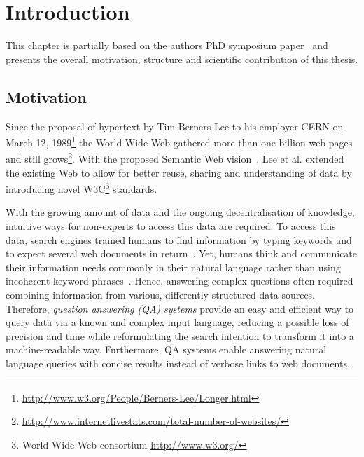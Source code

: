 \chapter{Introduction}
This chapter is partially based on the authors PhD symposium paper~\cite{combiningLDandIR} and presents the overall motivation, structure and scientific contribution of this thesis.
\section{Motivation}
Since the proposal of hypertext by Tim-Berners Lee to his employer CERN on March 12, 1989\footnote{\url{http://www.w3.org/People/Berners-Lee/Longer.html}} the World Wide Web gathered more than one billion web pages and still grows\footnote{\url{http://www.internetlivestats.com/total-number-of-websites/}}.
With the proposed Semantic Web vision~\cite{bernerslee2001semantic}, Lee et al. extended the existing Web to allow for better reuse, sharing and understanding of data by introducing novel W3C\footnote{World Wide Web consortium \url{http://www.w3.org/}} standards. 

With the growing amount of data and the ongoing decentralisation of knowledge, intuitive ways for non-experts to access this data are required. 
To access this data, search engines trained humans to find information by typing keywords and to expect several web documents in return~\cite{ilprints361}.
Yet, humans think and communicate their information needs commonly in their natural language rather than using incoherent keyword phrases~\cite{woods1973progress}. 
Hence, answering complex questions often required combining information from various, differently structured data sources.
Therefore, \emph{question answering (QA) systems} provide an easy and efficient way to query data via a known and complex input language, reducing a possible loss of precision and time while reformulating the search intention to transform it into a machine-readable way.
Furthermore, QA systems enable answering natural language queries with concise results instead of verbose links to web documents. 



